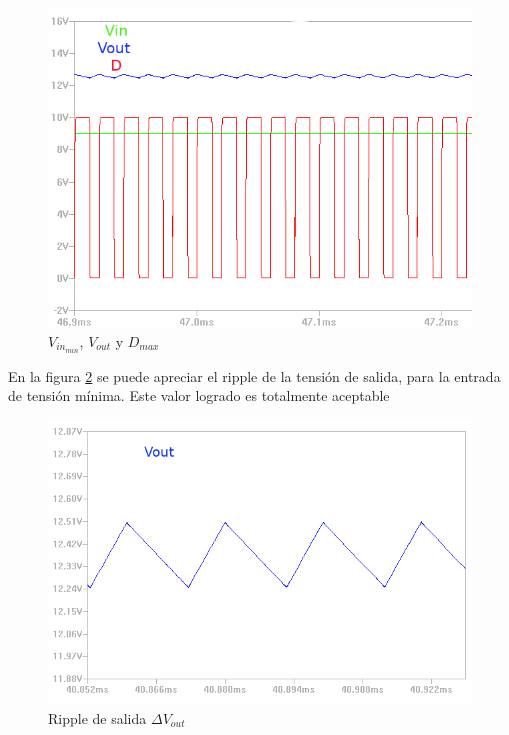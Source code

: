     \begin{figure}[htbp]
            \centering
             \includegraphics[scale = 0.3]{Figuras/Curvas_Vin9V.png}
            \caption{$V_{in_{min}}$, $V_{out}$ y $D_{max}$}
            \label{fig:Curvas Vin9V}
      \end{figure}
    
    En la figura \ref{fig: Ripple de salida} se puede apreciar el ripple de la tensión de salida, para la entrada de tensión mínima. Este valor logrado es totalmente aceptable
    
    \begin{figure}[htbp]
            \centering
             \includegraphics[scale = 0.3]{Figuras/rippleVin9.png}
            \caption{ Ripple de salida $\Delta V_{out}$ }
            \label{fig: Ripple de salida}
      \end{figure}
    
